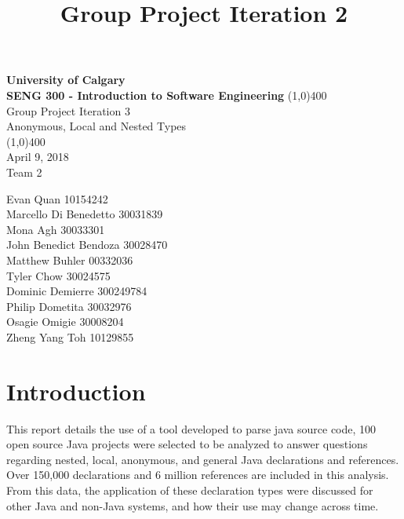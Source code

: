 \documentclass[12p]{article}
\title{\vspace{-6ex}Group Project Iteration 2}
\date{\vspace{-12ex}}
\begin{document}
\thispagestyle{fancy}

\begin{titlepage}
  \begin{center}
    \vspace{1cm}
    \Large{\textbf{University of Calgary}}\\
    \Large{\textbf{SENG 300  - Introduction to Software Engineering}}
    \vfill
    \line(1,0){400}\\[1mm]
    \huge{Group Project Iteration 3}\\
    \large{Anonymous, Local and Nested Types}\\
    \line(1,0){400}\\
    \Large April 9, 2018\\
    \vfill
    \huge{Team 2}\\
    \large
    \begin{multicols}{2}
      Evan Quan 10154242\\
      Marcello Di Benedetto 30031839\\
      Mona Agh 30033301\\
      John Benedict Bendoza 30028470\\
      Matthew Buhler 00332036\\
      Tyler Chow 30024575\\
      Dominic Demierre 300249784\\
      Philip Dometita 30032976\\
      Osagie Omigie 30008204\\
      Zheng Yang Toh 10129855\\
    \end{multicols}
  \end{center}
\end{titlepage}

\tableofcontents
\thispagestyle{empty}
\clearpage

\onehalfspacing

\setcounter{page}{1}

\section{Introduction}
This report details the use of a tool developed to parse java source code, 100 open source Java projects were selected to be analyzed to answer questions regarding nested, local, anonymous, and general Java declarations and references.
Over 150,000 declarations and 6 million references are included in this analysis.
From this data, the application of these declaration types were discussed for other Java and non-Java systems, and how their use may change across time.
\end{document}
